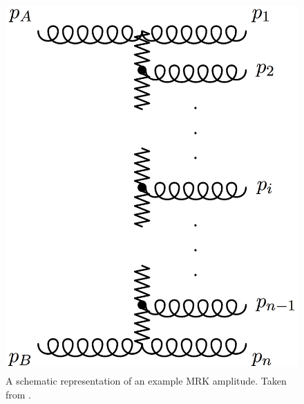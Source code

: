 \begin{figure}[t]
\centering
\includegraphics[scale=0.3]{Images/MRK_diagram.png} 
\caption{A schematic representation of an example MRK amplitude. Taken from \cite{Andersen2009a}.}
\label{fig:mrk}
\end{figure}

